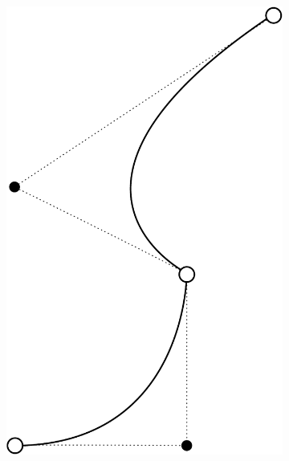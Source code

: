 \begin{figure}
\centering
\begin{subfigure}{0.3\linewidth}
\includegraphics[width=\linewidth]{figs/g0}
\caption{}%
\label{subfig:g0}
\end{subfigure}%
\begin{subfigure}{0.3\linewidth}

\end{subfigure}
\end{figure}
